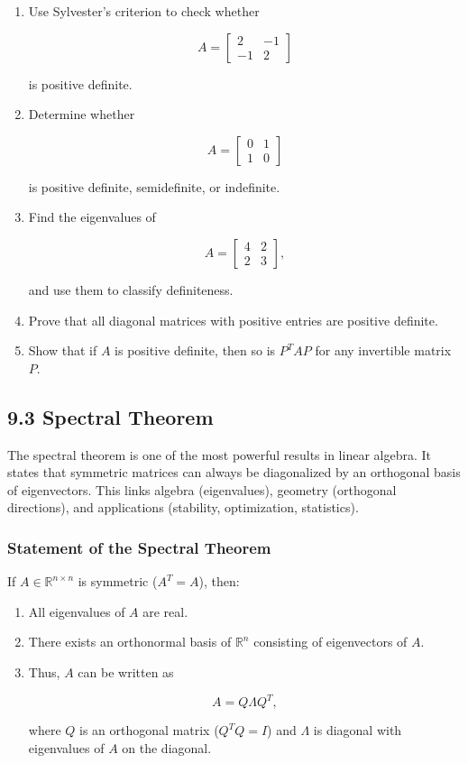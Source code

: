 \documentclass[
  12pt,
  a4paper,
]{article}
\begin{document}
\begin{enumerate}
\def\labelenumi{\arabic{enumi}.}
\item
  Use Sylvester's criterion to check whether

  \[A = \begin{bmatrix} 2 & -1 \\ -1 & 2 \end{bmatrix}\]

  is positive definite.
\item
  Determine whether

  \[A = \begin{bmatrix} 0 & 1 \\ 1 & 0 \end{bmatrix}\]

  is positive definite, semidefinite, or indefinite.
\item
  Find the eigenvalues of

  \[A = \begin{bmatrix} 4 & 2 \\ 2 & 3 \end{bmatrix},\]

  and use them to classify definiteness.
\item
  Prove that all diagonal matrices with positive entries are positive
  definite.
\item
  Show that if \(A\) is positive definite, then so is \(P^T A P\) for
  any invertible matrix \(P\).
\end{enumerate}

\subsection{9.3 Spectral Theorem}\label{93-spectral-theorem}

The spectral theorem is one of the most powerful results in linear
algebra. It states that symmetric matrices can always be diagonalized by
an orthogonal basis of eigenvectors. This links algebra (eigenvalues),
geometry (orthogonal directions), and applications (stability,
optimization, statistics).

\subsubsection{Statement of the Spectral
Theorem}\label{statement-of-the-spectral-theorem}

If \(A \in \mathbb{R}^{n \times n}\) is symmetric (\(A^T = A\)), then:

\begin{enumerate}
\def\labelenumi{\arabic{enumi}.}
\item
  All eigenvalues of \(A\) are real.
\item
  There exists an orthonormal basis of \(\mathbb{R}^n\) consisting of
  eigenvectors of \(A\).
\item
  Thus, \(A\) can be written as

  \[A = Q \Lambda Q^T,\]

  where \(Q\) is an orthogonal matrix (\(Q^T Q = I\)) and \(\Lambda\) is
  diagonal with eigenvalues of \(A\) on the diagonal.
\end{enumerate}
\end{document}
